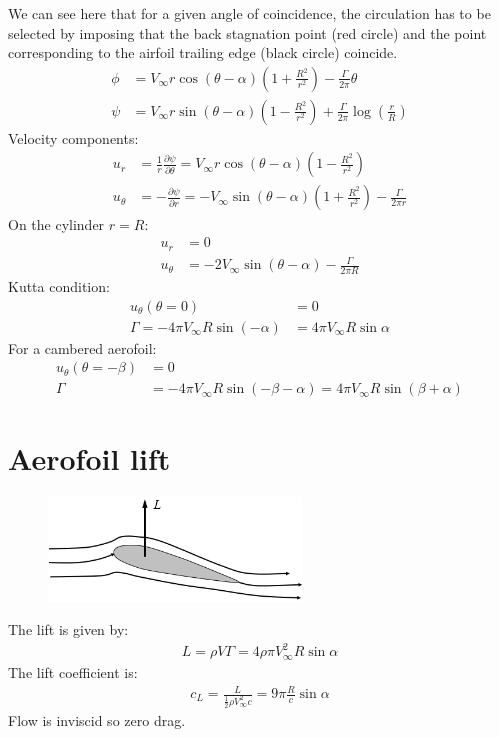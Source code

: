 \documentclass[class=report, crop=false, 12pt,a4paper]{standalone}
\begin{document}
We can see here that for a given angle of coincidence, the circulation has to be selected by imposing that the back stagnation point (red circle) and the point corresponding to the airfoil trailing edge (black circle) coincide.
\begin{align}
  \phi &= V_\infty r \cos{(\theta - \alpha )}\left(1 + \frac{R^2}{r^2}\right) - \frac{\Gamma}{2\pi}\theta\\
  \psi &= V_\infty r \sin{(\theta - \alpha)}\left(1 - \frac{R^2}{r^2}\right) + \frac{\Gamma}{2\pi} \log{\left(\frac{r}{R}\right)}
\end{align}
Velocity components:
\begin{align}
  u_r &= \frac{1}{r} \frac{\partial \psi}{\partial \theta} = V_\infty r \cos{(\theta - \alpha)}\left(1-\frac{R^2}{r^2}\right)\\
  u_\theta &= - \frac{\partial \psi}{\partial r} = -V_\infty \sin{(\theta - \alpha)} \left(1 + \frac{R^2}{r^2}\right) - \frac{\Gamma}{2\pi r}
\end{align}
On the cylinder $r = R$:
\begin{align}
  u_r &= 0 \\
  u_\theta &= -2V_\infty \sin{(\theta-\alpha)} - \frac{\Gamma}{2\pi R}
\end{align}
Kutta condition:
\begin{align}
  u_\theta (\theta = 0) &= 0\\
  \Gamma = -4\pi V_\infty R \sin{(-\alpha)} &= 4\pi V_\infty R\sin{\alpha}
\end{align}
For a cambered aerofoil:
\begin{align}
  u_\theta (\theta = -\beta) &= 0\\
  \Gamma &= -4\pi V_\infty R \sin{(-\beta -\alpha)} = 4\pi V_\infty R \sin{(\beta + \alpha)}
\end{align}
\section{Aerofoil lift}
\begin{figure}[H]
  \centering
  \includegraphics[width = 0.6\textwidth]{../img/diagram41.png}
\end{figure}
The lift is given by:
\begin{align}
  L = \rho V \Gamma = 4 \rho \pi V_\infty^2 R \sin{\alpha}
\end{align}
The lift coefficient is:
\begin{align}
  c_L = \frac{L}{\frac{1}{2}\rho V_\infty^2 c} = 9\pi \frac{R}{c}\sin{\alpha}
\end{align}
Flow is inviscid so zero drag.
\end{document}

